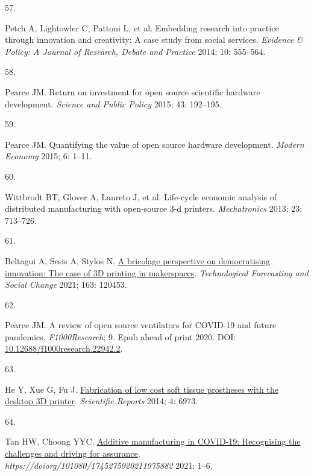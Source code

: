 \documentclass[
  11pt,
  a4paperpaper,
  onecolumn]{article}
\newlength{\cslhangindent}
\newlength{\csllabelwidth}
\newlength{\cslentryspacingunit} %
\newenvironment{CSLReferences}[2] %
 {%
  \setlength{\parindent}{0pt}
  \ifodd #1
  \let\oldpar\par
  \def\par{\hangindent=\cslhangindent\oldpar}
  \fi
  \setlength{\parskip}{#2\cslentryspacingunit}
 }%
 {}
\newcommand{\CSLLeftMargin}[1]{\parbox[t]{\csllabelwidth}{#1}}
\newcommand{\CSLRightInline}[1]{\parbox[t]{\linewidth - \csllabelwidth}{#1}\break}
\begin{document}
\begin{CSLReferences}{0}{0}
\leavevmode{}%
\CSLLeftMargin{57. }%
\CSLRightInline{Petch A, Lightowler C, Pattoni L, et al. Embedding
research into practice through innovation and creativity: A case study
from social services. \emph{Evidence \& Policy: A Journal of Research,
Debate and Practice} 2014; 10: 555--564.}

\leavevmode{}%
\CSLLeftMargin{58. }%
\CSLRightInline{Pearce JM. Return on investment for open source
scientific hardware development. \emph{Science and Public Policy} 2015;
43: 192--195.}

\leavevmode{}%
\CSLLeftMargin{59. }%
\CSLRightInline{Pearce JM. Quantifying the value of open source hardware
development. \emph{Modern Economy} 2015; 6: 1--11.}

\leavevmode{}%
\CSLLeftMargin{60. }%
\CSLRightInline{Wittbrodt BT, Glover A, Laureto J, et al. Life-cycle
economic analysis of distributed manufacturing with open-source 3-d
printers. \emph{Mechatronics} 2013; 23: 713--726.}

\leavevmode{}%
\CSLLeftMargin{61. }%
\CSLRightInline{Beltagui A, Sesis A, Stylos N.
\href{https://doi.org/10.1016/j.techfore.2020.120453}{A bricolage
perspective on democratising innovation: {The} case of {3D} printing in
makerspaces}. \emph{Technological Forecasting and Social Change} 2021;
163: 120453.}

\leavevmode{}%
\CSLLeftMargin{62. }%
\CSLRightInline{Pearce JM. A review of open source ventilators for
{COVID-19} and future pandemics. \emph{F1000Research}; 9. Epub ahead of
print 2020. DOI:
\href{https://doi.org/10.12688/f1000research.22942.2}{10.12688/f1000research.22942.2}.}

\leavevmode{}%
\CSLLeftMargin{63. }%
\CSLRightInline{He Y, Xue G, Fu J.
\href{https://doi.org/10.1038/srep06973}{Fabrication of low cost soft
tissue prostheses with the desktop {3D} printer}. \emph{Scientific
Reports} 2014; 4: 6973.}

\leavevmode{}%
\CSLLeftMargin{64. }%
\CSLRightInline{Tan HW, Choong YYC.
\href{https://doi.org/10.1080/17452759.2021.1975882}{Additive
manufacturing in {COVID-19}: Recognising the challenges and driving for
assurance}. \emph{https://doiorg/101080/1745275920211975882} 2021;
1--6.}


\end{CSLReferences}
\end{document}
